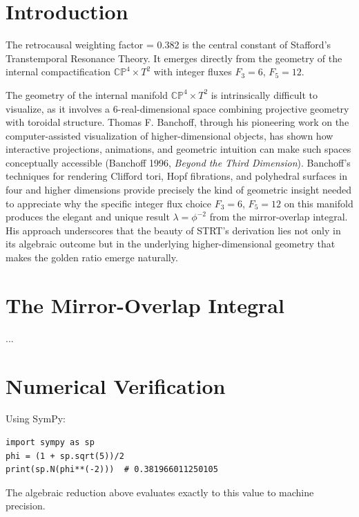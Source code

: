 
\section{Introduction}
The retrocausal weighting factor \lambda = 0.382 is the central constant of Stafford's Transtemporal Resonance Theory. It emerges directly from the geometry of the internal compactification \(\mathbb{CP}^4 \times T^2\) with integer fluxes \(F_3 = 6\), \(F_5 = 12\).

The geometry of the internal manifold \(\mathbb{CP}^4 \times T^2\) is intrinsically difficult to visualize, as it involves a 6-real-dimensional space combining projective geometry with toroidal structure. Thomas F. Banchoff, through his pioneering work on the computer-assisted visualization of higher-dimensional objects, has shown how interactive projections, animations, and geometric intuition can make such spaces conceptually accessible (Banchoff 1996, \textit{Beyond the Third Dimension}). Banchoff's techniques for rendering Clifford tori, Hopf fibrations, and polyhedral surfaces in four and higher dimensions provide precisely the kind of geometric insight needed to appreciate why the specific integer flux choice \(F_3 = 6\), \(F_5 = 12\) on this manifold produces the elegant and unique result \(\lambda = \phi^{-2}\) from the mirror-overlap integral. His approach underscores that the beauty of STRT's derivation lies not only in its algebraic outcome but in the underlying higher-dimensional geometry that makes the golden ratio emerge naturally.

\section{The Mirror-Overlap Integral}
...


\section{Numerical Verification}
Using SymPy:
\begin{verbatim}
import sympy as sp
phi = (1 + sp.sqrt(5))/2
print(sp.N(phi**(-2)))  # 0.381966011250105
\end{verbatim}
The algebraic reduction above evaluates exactly to this value to machine precision.

